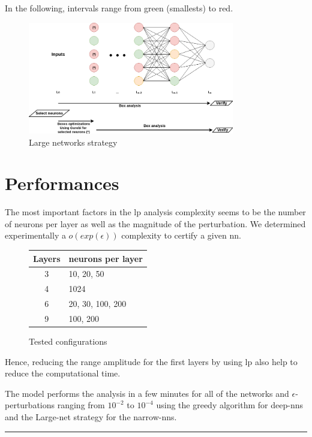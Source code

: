 \documentclass[8pt,a4paper]{article}
\begin{document}
\noindent In the following, intervals range from green (smallests) to red.

\begin{figure}[H]
\begin{center}
\includegraphics[width=9cm]{NN_lastlayer.png}
\caption{Large networks strategy}
\end{center}
\end{figure}

\section{Performances}

The most important factors in the \gls{lp} analysis complexity seems to be the number of neurons per layer as well as the magnitude of the perturbation. We determined experimentally a $o(exp(\epsilon))$ complexity to certify a given \gls{nn}. 
\begin{figure}
	\vspace{-20pt}
	\begin{center}
		\small
		\begin{tabular}{| c || l | }
			Layers & neurons per layer \\
			\hline
			3 & 10, 20, 50 \\
			4 & 1024 \\
			6 & 20, 30, 100, 200 \\
			9 & 100, 200 \\
		\end{tabular}
	\end{center}
	\vspace{-11pt}
	\caption{Tested configurations}
	\vspace{-10pt}
\end{figure}
Hence, reducing the range amplitude for the first layers by using \gls{lp} also help to reduce the computational time.

\noindent The model performs the analysis in a few minutes for all of the networks and $\epsilon$-perturbations ranging from $10^{-2}$ to $10^{-4}$ using the greedy algorithm for deep-\gls{nn}s and the Large-net strategy for the narrow-\gls{nn}s.

\vfill
\hrule
\end{document}
